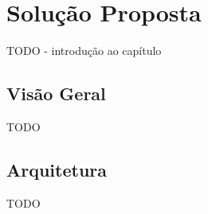 \chapter{Solução Proposta}
\label{ch:4}

TODO - introdução ao capítulo

\section{Visão Geral}
TODO

\section{Arquitetura}
TODO
